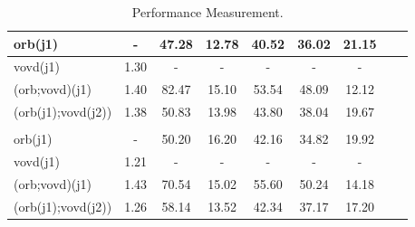 \begin{table}[hbt]
\begin{tabularx}{\linewidth}{@{}l*{7}{C}c@{}}
		\hline
		orb(j1)            & -             & 47.28          & 12.78             & 40.52                 & 36.02                  & 21.15           \\ \hline
		vovd(j1)           & 1.30          & -              & -                 & -                     & -                      & -               \\ \hline
		(orb;vovd)(j1)     & 1.40          & 82.47          & 15.10             & 53.54                 & 48.09                  & 12.12           \\ \hline
		(orb(j1);vovd(j2)) & 1.38          & 50.83          & 13.98             & 43.80                 & 38.04                  & 19.67           \\ \hline
		                                                                                                                                \\
		\hline
		orb(j1)            & -             & 50.20          & 16.20             & 42.16                 & 34.82                  & 19.92           \\ \hline
		vovd(j1)           & 1.21          & -              & -                 & -                     & -                      & -               \\ \hline
		(orb;vovd)(j1)     & 1.43          & 70.54          & 15.02             & 55.60                 & 50.24                  & 14.18           \\ \hline
		(orb(j1);vovd(j2)) & 1.26          & 58.14          & 13.52             & 42.34                 & 37.17                  & 17.20           \\ \hline
		\bottomrule
	\end{tabularx}
	\caption{\label{tab:Performance-Measurement2}Performance Measurement.}
\end{table}







\clearpage
\thispagestyle{empty}